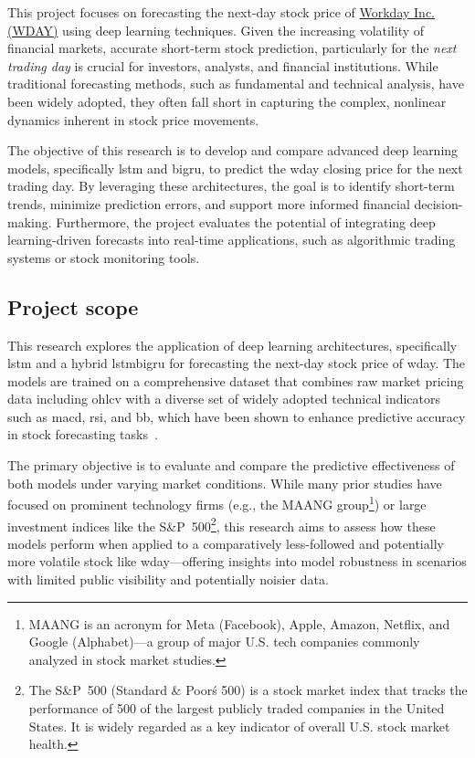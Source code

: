 This project focuses on forecasting the next-day stock price of 
\href{https://www.nasdaq.com/market-activity/stocks/wday}{Workday Inc. (WDAY)} using deep learning techniques. 
Given the increasing volatility of financial markets, accurate short-term stock prediction, particularly 
for the \emph{next trading day} is crucial for investors, analysts, and financial institutions. While traditional 
forecasting methods, such as fundamental and technical analysis, have been widely adopted, they often fall short in 
capturing the complex, nonlinear dynamics inherent in stock price movements.

The objective of this research is to develop and compare advanced deep learning models, specifically \acrfull{lstm} and 
\acrfull{bigru}, to predict the \acrfull{wday} closing price for the next trading day. By leveraging these architectures, the
goal is to identify short-term trends, minimize prediction errors, and support more informed financial 
decision-making. Furthermore, the project evaluates the potential of integrating deep learning-driven forecasts into
real-time applications, such as algorithmic trading systems or stock monitoring tools.

\subsection{Project scope}

This research explores the application of deep learning architectures, specifically 
\acrfull{lstm} and a hybrid \acrfull{lstmbigru} for forecasting the next-day stock 
price of \acrfull{wday}. The models are trained on a comprehensive dataset that 
combines raw market pricing data including \acrfull{ohlcv} with a diverse set of 
widely adopted technical indicators such as  \acrfull{macd}, \acrfull{rsi}, and
\acrfull{bb}, which have been shown to enhance predictive 
accuracy in stock forecasting 
tasks~\parencite{guo2024LSTMStock, agrawal2022StockPrediction}.

The primary objective is to evaluate and compare the predictive effectiveness 
of both models under varying market conditions. While many prior studies have 
focused on prominent technology firms (e.g., the  MAANG group\footnote{MAANG is an
acronym for Meta (Facebook), Apple, Amazon, Netflix, and Google (Alphabet)—a group of 
major U.S. tech companies commonly analyzed in stock market studies.}) or large 
investment indices like the S\&P~500\footnote{The S\&P~500 (Standard \& Poor\'s 500) 
is a stock market index that tracks the performance of 500 of the largest publicly 
traded companies in the United States. It is widely regarded as a key indicator of 
overall U.S. stock market health.}, this research aims to assess how 
these models perform when applied to a comparatively less-followed and potentially 
more volatile stock like \acrshort{wday}—offering insights 
into model robustness in scenarios with limited public visibility and 
potentially noisier data.

